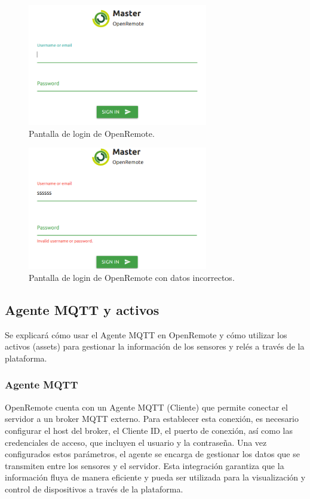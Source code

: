 \begin{figure}[H]
\centering 
\includegraphics[width=0.7\textwidth]{./Figures/login_op.png}
\caption{Pantalla de login de OpenRemote.}
\label{fig:login_op}
\end{figure}

\begin{figure}[H]
\centering 
\includegraphics[width=0.7\textwidth]{./Figures/login_op_inc.png}
\caption{Pantalla de login de OpenRemote con datos incorrectos.}
\label{fig:login_op_inc}
\end{figure}    

\subsection{Agente MQTT y activos}
Se explicará cómo usar el Agente MQTT en OpenRemote y cómo utilizar los activos (assets) para gestionar la información de los sensores y relés a través de la plataforma.

\subsubsection{Agente MQTT}

OpenRemote cuenta con un Agente MQTT (Cliente) que permite conectar el servidor a un broker MQTT externo. Para establecer esta conexión, es necesario configurar el host del broker, el Cliente ID, el puerto de conexión, así como las credenciales de acceso, que incluyen el usuario y la contraseña. Una vez configurados estos parámetros, el agente se encarga de gestionar los datos que se transmiten entre los sensores y el servidor. Esta integración garantiza que la información fluya de manera eficiente y pueda ser utilizada para la visualización y control de dispositivos a través de la plataforma.

